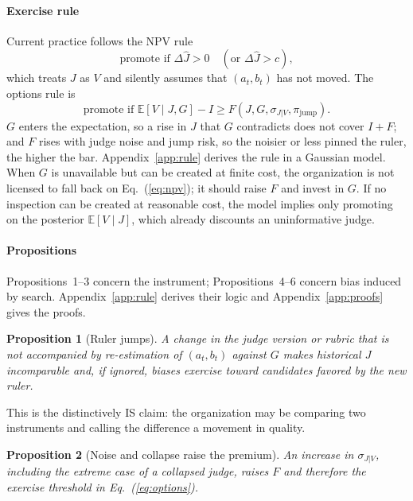 \documentclass[acmsmall,screen,review]{acmart}
\newtheorem{proposition}{Proposition}
\theoremstyle{acmdefinition}
\begin{document}
\paragraph{Exercise rule} Current practice follows the NPV rule
\begin{equation}\label{eq:npv}
\text{promote if } \Delta\hat{J} > 0 \quad (\text{or } \Delta\hat{J} > c),
\end{equation}
which treats $J$ as $V$ and silently assumes that $(a_t,b_t)$ has not moved. The options rule is
\begin{equation}\label{eq:options}
\text{promote if } \mathbb{E}[V \mid J, G] - I \ge F(J, G, \sigma_{J|V}, \pi_{\text{jump}}).
\end{equation}
$G$ enters the expectation, so a rise in $J$ that $G$ contradicts does not cover $I + F$; and $F$ rises with judge noise and jump risk, so the noisier or less pinned the ruler, the higher the bar. Appendix~\ref{app:rule} derives the rule in a Gaussian model. When $G$ is unavailable but can be created at finite cost, the organization is not licensed to fall back on Eq.~(\ref{eq:npv}); it should raise $F$ and invest in $G$. If no inspection can be created at reasonable cost, the model implies only promoting on the posterior $\mathbb{E}[V \mid J]$, which already discounts an uninformative judge.

\paragraph{Propositions} Propositions~1--3 concern the instrument; Propositions~4--6 concern bias induced by search. Appendix~\ref{app:rule} derives their logic and Appendix~\ref{app:proofs} gives the proofs.

\begin{proposition}[Ruler jumps]
A change in the judge version or rubric that is not accompanied by re-estimation of $(a_t,b_t)$ against $G$ makes historical $J$ incomparable and, if ignored, biases exercise toward candidates favored by the new ruler.
\end{proposition}

This is the distinctively IS claim: the organization may be comparing two instruments and calling the difference a movement in quality.

\begin{proposition}[Noise and collapse raise the premium]
An increase in $\sigma_{J|V}$, including the extreme case of a collapsed judge, raises $F$ and therefore the exercise threshold in Eq.~(\ref{eq:options}).
\end{proposition}
\end{document}

